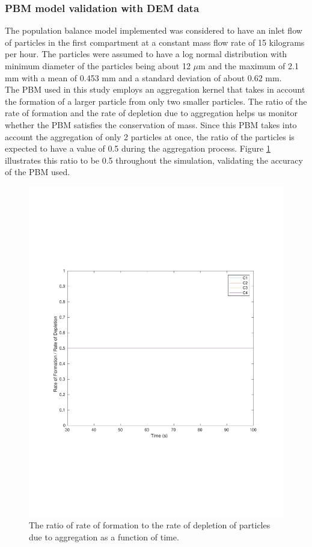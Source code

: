 \documentclass[preprint,11pt,authoryear]{elsarticle}
\begin{document}
\subsubsection{PBM model validation with DEM data}
 The population balance model implemented was considered to have an inlet flow of particles in the 
first compartment at a constant mass flow rate of 15 kilograms per hour. The particles were assumed 
to have a log normal distribution with minimum diameter of the particles being about 12 $\mu$m and the 
maximum of 2.1 mm with a mean of 0.453 mm and a standard deviation of about 0.62 mm. \\
The PBM used in this study employs an aggregation kernel that takes in account the formation of a 
larger particle from only two smaller particles. The ratio of the rate of formation and the rate of 
depletion due to aggregation helps us monitor whether the PBM satisfies the conservation of mass. 
Since this PBM takes into account the aggregation of only 2 particles at once, the ratio of the particles 
is expected to have a value of 0.5 during the aggregation process. Figure \ref{fig:rslts_PBM_ratio_plot_2mm}
 illustrates this ratio to be 0.5 throughout the simulation, validating the accuracy of the PBM used.\\
\begin{figure}[H]
\begin{center}
\includegraphics[scale=0.5]{rslts_PBM_2mm_validation.pdf}
\caption{The ratio of rate of formation to the rate of depletion of particles due to aggregation as a function 
of time.}
\label{fig:rslts_PBM_ratio_plot_2mm}
\end{center}
\end{figure}
\end{document}
